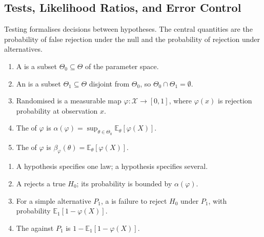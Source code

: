 \subsection{Tests, Likelihood Ratios, and Error Control}

Testing formalises decisions between hypotheses.  The central quantities are the probability of false rejection under the null and the probability of rejection under alternatives.

\begin{definition} \label{def:hypotheses-tests-size-power} 
\begin{enumerate}[label=(\roman*)]
\setlength{\itemsep}{0pt}
\item A  is a subset $\Theta_0\subseteq\Theta$ of the parameter space.
\item An  is a subset $\Theta_1\subseteq\Theta$ disjoint from $\Theta_0$, so $\Theta_0\cap\Theta_1=\emptyset$.
\item Randomised  is a measurable map $\varphi:\mathcal{X}\to[0,1]$, where $\varphi(x)$ is rejection probability at observation $x$.
\item The  of $\varphi$ is $\alpha(\varphi)=\sup_{\theta\in\Theta_0}\mathbb{E}_\theta[\varphi(X)]$.
\item The  of $\varphi$ is $\beta_\varphi(\theta)=\mathbb{E}_\theta[\varphi(X)]$.
\end{enumerate}
\end{definition}

\begin{definition} \label{def:simple-composite-type-errors} 
\begin{enumerate}[label=(\roman*)]
\setlength{\itemsep}{0pt}
\item A  hypothesis specifies one law; a  hypothesis specifies several.
\item A  rejects a true $H_0$; its probability is bounded by $\alpha(\varphi)$.
\item For a simple alternative $P_1$, a  is failure to reject $H_0$ under $P_1$, with probability $\mathbb{E}_1[1-\varphi(X)]$.
\item The  against $P_1$ is $1-\mathbb{E}_1[1-\varphi(X)]$.
\end{enumerate}
\end{definition}

